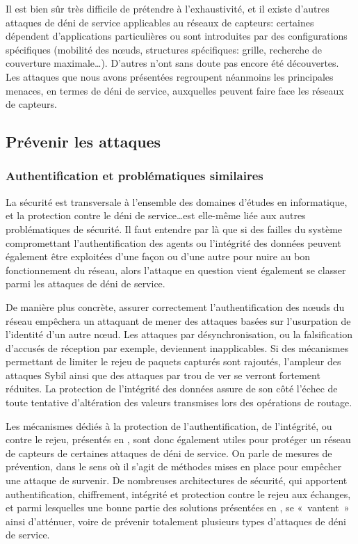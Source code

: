Il est bien sûr très difficile de prétendre à l'exhaustivité, et il existe d'autres attaques de déni de service applicables au réseaux de capteurs: certaines dépendent d'applications particulières ou sont introduites par des configurations spécifiques (mobilité des nœuds, structures spécifiques: grille, recherche de couverture maximale\dots).
D'autres n'ont sans doute pas encore été découvertes.
Les attaques que nous avons présentées regroupent néanmoins les principales menaces, en termes de déni de service, auxquelles peuvent faire face les réseaux de capteurs.

\subsection{Prévenir les attaques}

    \subsubsection{Authentification et problématiques similaires}
La sécurité est transversale à l'ensemble des domaines d'études en informatique, et la protection contre le déni de service\dots est elle-même liée aux autres problématiques de sécurité.
Il faut entendre par là que si des failles du système compromettant l'authentification des agents ou l'intégrité des données peuvent également être exploitées d'une façon ou d'une autre pour nuire au bon fonctionnement du réseau, alors l'attaque en question vient également se classer parmi les attaques de déni de service.

De manière plus concrète, assurer correctement l'authentification des nœuds du réseau empêchera un attaquant de mener des attaques basées sur l'usurpation de l'identité d'un autre nœud.
Les attaques par désynchronisation, ou la falsification d'accusés de réception par exemple, deviennent inapplicables.
Si des mécanismes permettant de limiter le rejeu de paquets capturés sont rajoutés, l'ampleur des attaques Sybil ainsi que des attaques par trou de ver se verront fortement réduites.
La protection de l'intégrité des données assure de son côté l'échec de toute tentative d'altération des valeurs transmises lors des opérations de routage.

Les mécanismes dédiés à la protection de l'authentification, de l'intégrité, ou contre le rejeu, présentés en , sont donc également utiles pour protéger un réseau de capteurs de certaines attaques de déni de service.
On parle de mesures de prévention, dans le sens où il s'agit de méthodes mises en place pour empêcher une attaque de survenir.
De nombreuses architectures de sécurité, qui apportent authentification, chiffrement, intégrité et protection contre le rejeu aux échanges, et parmi lesquelles une bonne partie des solutions présentées en , se « vantent » ainsi d'atténuer, voire de prévenir totalement plusieurs types d'attaques de déni de service.

